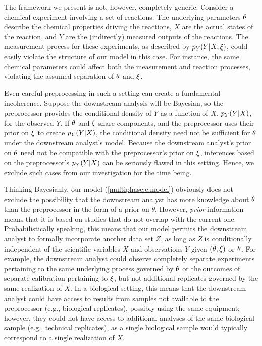 The framework we present is not, however, completely generic.
Consider a chemical experiment involving a set of reactions.
The underlying parameters $\theta$ describe the chemical properties driving the reactions, $X$ are the actual states of the reaction, and $Y$ are the (indirectly) measured outputs of the reactions.
The measurement process for these experiments, as described by $p_Y(Y|X, \xi)$, could easily violate the structure of our model in this case.
For instance, the same chemical parameters could affect both the measurement and reaction processes, violating the assumed separation of $\theta$ and $\xi$.

Even careful preprocessing in such a setting can create a fundamental incoherence.
Suppose the downstream analysis will be Bayesian, so the preprocessor provides the conditional density of $Y$ as a function of $X$, $p_Y(Y | X)$,  for the observed $Y$.
If $\theta$ and $\xi$ share components, and the preprocessor uses their prior on $\xi$ to create $p_Y(Y | X)$, the conditional density need not be sufficient for $\theta$ under the downstream analyst's model.
Because the downstream analyst's prior on $\theta$ need not be compatible with the preprocessor's prior on $\xi$, inferences based on the preprocessor's $p_Y(Y | X)$ can be seriously flawed in this setting.
Hence, we exclude such cases from our investigation for the time being.

Thinking Bayesianly, our model  (\ref{multiphase:e:model}) obviously  does not exclude the possibility that the downstream analyst has more knowledge about $\theta$ than the preprocessor in the form of a prior on $\theta$.
However, \textit{prior} information means that it is based on studies that do not overlap with the current one.
Probabilistically  speaking,  this means that our model permits the downstream analyst to formally incorporate  another data set $Z$,  as long as $Z$ is conditionally independent of the scientific variables $X$ and observations $Y$ given $(\theta, \xi)$ or $\theta$.
For example, the downstream analyst could observe completely separate experiments pertaining to the same underlying process governed by $\theta$ or the outcomes of separate calibration pertaining to $\xi$, but not additional replicates governed by the same realization of $X$.
In a biological setting, this means that the downstream analyst could have access to results from samples not available to the preprocessor (e.g., biological replicates), possibly using the same equipment; however, they could not have access to additional analyses of the same biological sample (e.g., technical replicates), as a single biological sample would typically correspond to a single realization of $X$.

